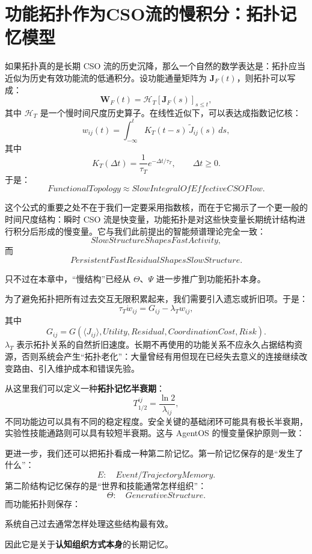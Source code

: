 \section{功能拓扑作为CSO流的慢积分：拓扑记忆模型}

如果拓扑真的是长期 CSO 流的历史沉降，那么一个自然的数学表达是：拓扑应当近似为历史有效功能流的低通积分。设功能通量矩阵为 $\mathbf{J}_F(t)$，则拓扑可以写成：
\[
\boxed{
\mathbf{W}_F(t)
=
\mathcal{H}_{T}
\left[
\mathbf{J}_F(s)
\right]_{s\leq t},
}
\]
其中 $\mathcal{H}_{T}$ 是一个慢时间尺度历史算子。在线性近似下，可以表达成指数记忆核：
\[
w_{ij}(t)
=
\int_{-\infty}^{t}
K_T(t-s)
\,
\widetilde{J}_{ij}(s)
\,ds,
\]
其中
\[
K_T(\Delta t)
=
\frac{1}{\tau_T}
e^{-\Delta t/\tau_T},
\qquad
\Delta t\geq0.
\]
于是：
\[
\boxed{
FunctionalTopology
\approx
SlowIntegralOfEffectiveCSOFlow.
}
\]

这个公式的重要之处不在于我们一定要采用指数核，而在于它揭示了一个更一般的时间尺度结构：瞬时 CSO 流是快变量，功能拓扑是对这些快变量长期统计结构进行积分后形成的慢变量。它与我们此前提出的智能频谱理论完全一致：
\[
SlowStructureShapesFastActivity,
\]
而
\[
PersistentFastResidualShapesSlowStructure.
\]

只不过在本章中，``慢结构''已经从 $\Theta$、$\Psi$ 进一步推广到功能拓扑本身。

为了避免拓扑把所有过去交互无限积累起来，我们需要引入遗忘或折旧项。于是：
\[
\tau_T\dot w_{ij}
=
G_{ij}
-
\lambda_Tw_{ij},
\]
其中
\[
G_{ij}
=
G
\left(
\langle J_{ij}\rangle,
Utility,
Residual,
CoordinationCost,
Risk
\right).
\]
$\lambda_T$ 表示拓扑关系的自然折旧速度。长期不再使用的功能关系不应永久占据结构资源，否则系统会产生``拓扑老化''：大量曾经有用但现在已经失去意义的连接继续改变路由、引入维护成本和错误先验。

从这里我们可以定义一种\textbf{拓扑记忆半衰期}：
\[
T_{1/2}^{ij}
=
\frac{\ln 2}{\lambda_{ij}},
\]
不同功能边可以具有不同的稳定程度。安全关键的基础闭环可能具有极长半衰期，实验性技能通路则可以具有较短半衰期。这与 AgentOS 的慢变量保护原则一致：
\begin{statementbox}
\centering
{}
\end{statementbox}

更进一步，我们还可以把拓扑看成一种第二阶记忆。第一阶记忆保存的是``发生了什么''：
\[
E:
\quad
Event/TrajectoryMemory.
\]
第二阶结构记忆保存的是``世界和技能通常怎样组织''：
\[
\Theta:
\quad
GenerativeStructure.
\]
而功能拓扑则保存：
\begin{statementbox}
系统自己过去通常怎样处理这些结构最有效。
\end{statementbox}
因此它是关于\textbf{认知组织方式本身}的长期记忆。

